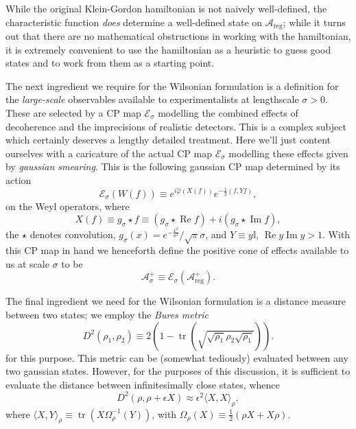 \documentclass[11pt]{amsart}
\DeclareMathOperator{\tr}{tr}
\DeclareMathOperator{\im}{Im}
\DeclareMathOperator{\re}{Re}
\theoremstyle{plain}%
\theoremstyle{definition}
\theoremstyle{remark}
\begin{document}
While the original Klein-Gordon hamiltonian is not naively well-defined, the characteristic function \emph{does} determine a well-defined state on $\mathcal{A}_{\text{reg}}$; while it turns out that there are no mathematical obstructions in working with the hamiltonian, it is extremely convenient to use the hamiltonian as a heuristic to guess good states and to work from them as a starting point.

The next ingredient we require for the Wilsonian formulation is a definition for the \emph{large-scale} observables available to experimentalists at lengthscale $\sigma > 0$. These are selected by a CP map $\mathcal{E}_\sigma$ modelling the combined effects of decoherence and the imprecisions of realistic detectors. This is a complex subject which certainly deserves a lengthy detailed treatment. Here we'll just content ourselves with a caricature of the actual CP map $\mathcal{E}_\sigma$ modelling these effects given by \emph{gaussian smearing}. This is the following gaussian CP map determined by its action 
\begin{equation}
	\mathcal{E}_\sigma(W(f)) \equiv e^{i\widehat{\varphi}(X(f))}e^{-\frac12(f,Yf)},
\end{equation}
on the Weyl operators, where
\begin{equation}
	X(f) \equiv g_\sigma\star f \equiv (g_\sigma \star \re f) + i (g_\sigma \star \im f),
\end{equation}
the $\star$ denotes convolution, $g_\sigma(x) = e^{-\frac{x^2}{\sigma^2}}/\sqrt{\pi}\sigma$, and $Y \equiv y \mathbb{I}$, $\re{y}\im{y}> 1$. With this CP map in hand we henceforth define the positive cone of effects available to us at scale $\sigma$ to be
\begin{equation}
	\mathcal{A}_\sigma^+ \equiv \mathcal{E}_\sigma (\mathcal{A}_{\text{reg}}^+).
\end{equation}


The final ingredient we need for the Wilsonian formulation is a distance measure between two states; we employ the \emph{Bures metric}
\begin{equation}
	D^2(\rho_1,\rho_2) \equiv 2\left(1-\tr\left(\sqrt{\sqrt{\rho_1}\rho_2\sqrt{\rho_1}}\right)\right).
\end{equation} 
for this purpose. This metric can be (somewhat tediously) evaluated \cite{marian_uhlmann_2012} between any two gaussian states. However, for the purposes of this discussion, it is sufficient to evaluate the distance between infinitesimally close states, whence
\begin{equation}
	D^2(\rho,\rho + \epsilon X) \approx \epsilon^2 \langle X, X\rangle_\rho,
\end{equation}
where $\langle X, Y\rangle_{\rho} \equiv \tr(X\Omega_\rho^{-1}(Y))$, with $\Omega_\rho(X) \equiv \frac12 (\rho X + X \rho)$.
\end{document}
